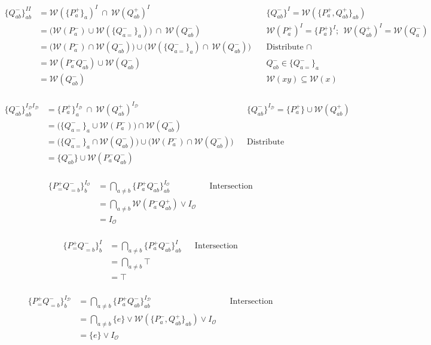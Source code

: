 \documentclass{article}
\theoremstyle{definition}
\newcommand{\cD}{\mathcal{D}}
\newcommand{\cO}{\mathcal{O}}
\newcommand{\cW}{\mathcal{W}}
\begin{document}
\begin{align*}
\{Q^-_{ab}\}_{ab}^{II}
&=\cW(\{P^+_a\}_{a})^{I}\ \cap\ \cW(Q^+_{ab})^{I} && \{Q^-_{ab}\}^I=\cW(\{P^+_a,Q^+_{ab}\}_{ab})\\
&=\bigl(\cW(P^-_a)\cup\cW(\{Q^-_{a=}\}_{a})\bigr)\ \cap\ \cW(Q^-_{ab})  && \cW(P^+_a)^I=\{P^+_a\}^I;\ \ \cW(Q^+_{ab})^I=\cW(Q^-_{a})\\
&=\bigl(\cW(P^-_a) \cap \cW(Q^-_{ab}) \bigr)\cup\bigl(\cW(\{Q^-_{a=}\}_{a}) \cap\ \cW(Q^-_{ab})\bigr)\  && \text{Distribute }\cap\\
&=\cW(P^-_aQ^-_{ab}) \cup\cW(Q^-_{ab})  && Q^-_{ab} \in \{Q^-_{a=}\}_{a}\\
&=\cW(Q^-_{ab})\  && \cW(xy)\subseteq\cW(x)\\
\end{align*}

\begin{align*}
\{Q^-_{ab}\}_{ab}^{I_\cD I_\cD }
&=\{P^+_a\}_{a}^{I_\cD }\ \cap\ \cW(Q^+_{ab})^{I_\cD } && \{Q^-_{ab}\}^{I_\cD }=\{P^+_a\}\cup \cW(Q^+_{ab})\\
&= \bigl(\{Q^-_{a=}\}_a \cup \cW(P^-_a)\bigr)\cap \cW(Q^-_{ab})  &&\\
&= \bigl(\{Q^-_{a=}\}_a\cap \cW(Q^-_{ab})\bigr)\cup \bigl(\cW(P^-_a)\cap \cW(Q^-_{ab})\bigr)&&\text{Distribute}\\
&= \{Q^-_{ab}\}\cup \cW(P^-_aQ^-_{ab}) &&\\
\end{align*}

\begin{align*}
\{P^+_=Q^-_{=b}\}_{b}^{I_\cO} &=  \bigcap_{a \ne b} \{P^+_aQ^-_{ab}\}_{ab}^{I_\cO} && \text{Intersection } \\
&= \bigcap_{a \ne b} \cW(P^-_aQ^+_{ab})\vee I_\cO  && \\
&= I_\cO  && \\
\end{align*}

\begin{align*}
\{P^+_=Q^-_{=b}\}_{b}^{I} &=  \bigcap_{a \ne b} \{P^+_aQ^-_{ab}\}_{ab}^{I} && \text{Intersection } \\
&= \bigcap_{a \ne b} \top  && \\
&= \top  && \\
\end{align*}

\begin{align*}
\{P^+_=Q^-_{=b}\}_{b}^{I_\cD } &=  \bigcap_{a \ne b} \{P^+_aQ^-_{ab}\}_{ab}^{I_\cD } && \text{Intersection } \\
&= \bigcap_{a \ne b} \{e\} \vee \cW(\{P^-_a,Q^+_{ab}\}_{ab})\vee I_\cO  && \\
&= \{e\} \vee I_\cO  && \\
\end{align*}
\end{document}
